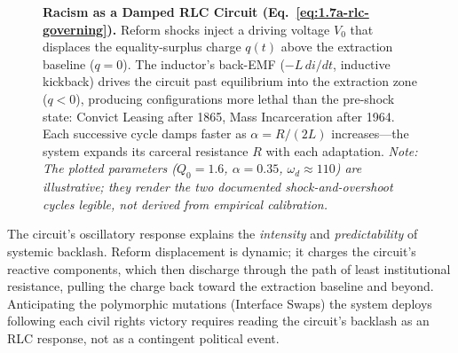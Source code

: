 \begin{figure}[htbp]
\caption{\textbf{Racism as a Damped RLC Circuit (Eq.~\ref{eq:1.7a-rlc-governing}).} Reform shocks inject a driving voltage $V_0$ that displaces the equality-surplus charge $q(t)$ above the extraction baseline ($q = 0$). The inductor's back-EMF ($-L\,di/dt$, inductive kickback) drives the circuit past equilibrium into the extraction zone ($q < 0$), producing configurations more lethal than the pre-shock state: Convict Leasing after 1865, Mass Incarceration after 1964. Each successive cycle damps faster as $\alpha = R/(2L)$ increases---the system expands its carceral resistance $R$ with each adaptation. \textit{Note: The plotted parameters ($Q_0 = 1.6$, $\alpha = 0.35$, $\omega_d \approx 110$) are illustrative; they render the two documented shock-and-overshoot cycles legible, not derived from empirical calibration.}}
\label{fig:backlash_oscillator}
\end{figure}

The circuit's oscillatory response explains the \textit{intensity} and \textit{predictability} of systemic backlash. Reform displacement is dynamic; it charges the circuit's reactive components, which then discharge through the path of least institutional resistance, pulling the charge back toward the extraction baseline and beyond. Anticipating the polymorphic mutations (Interface Swaps) the system deploys following each civil rights victory requires reading the circuit's backlash as an RLC response, not as a contingent political event.

